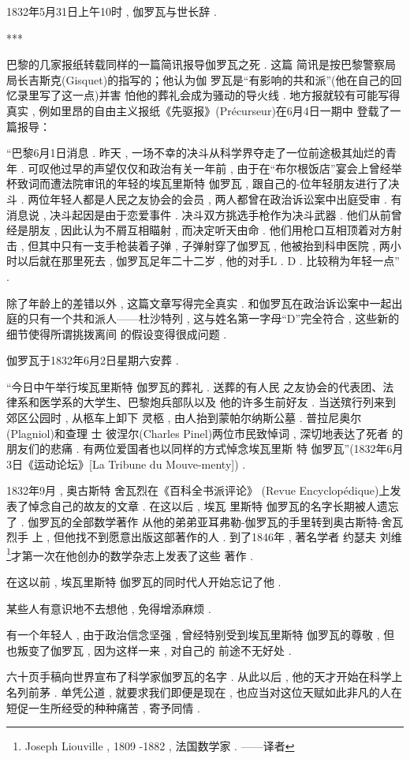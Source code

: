 1832年5月31日上午10时 , 伽罗瓦与世长辞 . 

\begin{center}***
\end{center}

巴黎的几家报纸转载同样的一篇简讯报导伽罗瓦之死 . 这篇 简讯是按巴黎警察局局长吉斯克(Gisquet)的指写的；他认为伽 罗瓦是“有影响的共和派”(他在自己的回忆录里写了这一点)并害 怕他的葬礼会成为骚动的导火线 . 地方报就较有可能写得真实 ,  例如里昂的自由主义报纸《先驱报》(Précurseur)在6月4日一期中 登载了一篇报导：


“巴黎6月1日消息 . 昨天 , 一场不幸的决斗从科学界夺走了一位前途极其灿烂的青年 . 可叹他过早的声望仅仅和政治有关一年前 , 由于在“布尔根饭店”宴会上曾经举杯致词而遭法院审讯的年轻的埃瓦里斯特 \textbullet 伽罗瓦 , 跟自己的-位年轻朋友进行了决斗 . 两位年轻人都是人民之友协会的会员 , 两人都曾在政治诉讼案中出庭受审 . 有消息说 , 决斗起因是由于恋爱事件 . 决斗双方挑选手枪作为决斗武器 . 他们从前曾经是朋友 , 因此认为不屑互相瞄射 , 而决定听天由命 . 他们用枪口互相顶着对方射击 , 但其中只有一支手枪装着子弹 , 子弹射穿了伽罗瓦 , 他被抬到科申医院 , 两小时以后就在那里死去 , 伽罗瓦足年二十二岁 , 他的对手L . D . 比较稍为年轻一点” . 

除了年龄上的差错以外 , 这篇文章写得完全真实 . 和伽罗瓦在政治诉讼案中一起出庭的只有一个共和派人——杜沙特列 , 这与姓名第一字母“D”完全符合 , 这些新的细节使得所谓挑拨离间 的假设变得很成问题 . 

伽罗瓦于1832年6月2日星期六安葬 . 

“今日中午举行埃瓦里斯特 \textbullet 伽罗瓦的葬礼 . 送葬的有人民 之友协会的代表团、法律系和医学系的大学生、巴黎炮兵部队以及 他的许多生前好友 . 当送殡行列来到郊区公园时 , 从柩车上卸下 灵柩 , 由人抬到蒙帕尔纳斯公墓 . 普拉尼奥尔(Plagniol)和查理 士 \textbullet 彼涅尔(Charles Pinel)两位市民致悼词 , 深切地表达了死者 的朋友们的悲痛 . 有两位爱国者也以同样的方式悼念埃瓦里斯 特 \textbullet 伽罗瓦”(1832年6月3日《运动论坛》[La Tribune du Mouve-menty]) . 

1832年9月 , 奥古斯特 \textbullet 舍瓦烈在《百科全书派评论》 (Revue Encyclopédique)上发表了悼念自己的故友的文章 . 在这以后 , 埃瓦 里斯特 \textbullet 伽罗瓦的名字长期被人遗忘了 . 伽罗瓦的全部数学著作
从他的弟弟亚耳弗勒-伽罗瓦的手里转到奥古斯特-舍瓦烈手 上 , 但他找不到愿意出版这部著作的人 . 到了1846年 , 著名学者 约瑟夫 \textbullet 刘维\footnote{Joseph Liouville , 1809 -1882 , 法国数学家 . ——译者}才第一次在他创办的数学杂志上发表了这些 著作 . 

在这以前 , 埃瓦里斯特 \textbullet 伽罗瓦的同时代人开始忘记了他 . 

某些人有意识地不去想他 , 免得增添麻烦 . 

有一个年轻人 , 由于政治信念坚强 , 曾经特别受到埃瓦里斯特 \textbullet 伽罗瓦的尊敬 , 但也叛变了伽罗瓦 , 因为这样一来 , 对自己的 前途不无好处 . 

六十页手稿向世界宣布了科学家伽罗瓦的名字 . 从此以后 ,  他的天才开始在科学上名列前茅 . 单凭公道 , 就要求我们即便是现在 , 也应当对这位天赋如此非凡的人在短促一生所经受的种种痛苦 , 寄予同情 . 




